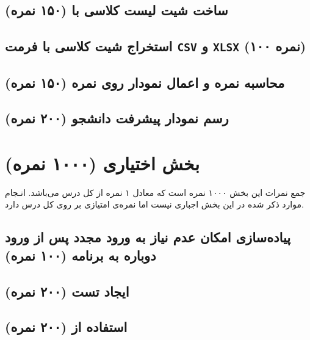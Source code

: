 \documentclass[a4paper]{report}
\begin{document}
\section{ساخت شیت لیست کلاسی با  (۱۵۰ نمره)}


\section{استخراج شیت کلاسی با فرمت \texttt{CSV} و \texttt{XLSX} (۱۰۰ نمره)}


\section{محاسبه نمره و اعمال نمودار روی نمره (۱۵۰ نمره)}


\section{رسم نمودار پیشرفت دانشجو (۲۰۰ نمره)}


\chapter{بخش اختیاری (۱۰۰۰ نمره)}
\begin{center}
    \begin{warningbox}
        \Large
        جمع نمرات این بخش ۱۰۰۰ نمره است که معادل ۱ نمره از کل درس می‌باشد.
        انـجام موارد ذکر شده در این بخش اجباری نیست اما نمره‌ی امتیازی بر روی کل درس دارد.
    \end{warningbox}
\end{center}

\section{پیاده‌سازی امکان عدم نیاز به ورود مجدد پس از ورود دوباره به برنامه (۱۰۰ نمره)}


\section{ایجاد تست  (۲۰۰ نمره)}


\section{استفاده از  (۲۰۰ نمره)}

\end{document}
